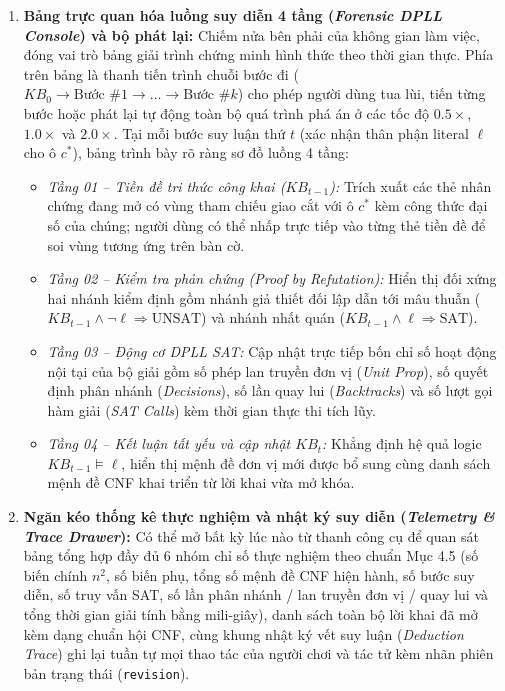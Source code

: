 \begin{enumerate}
    \item \textbf{Bảng trực quan hóa luồng suy diễn 4 tầng (\emph{Forensic DPLL Console}) và bộ phát lại:} Chiếm nửa bên phải của không gian làm việc, đóng vai trò bảng giải trình chứng minh hình thức theo thời gian thực. Phía trên bảng là thanh tiến trình chuỗi bước đi ($KB_0 \to \text{Bước \#1} \to \dots \to \text{Bước \#}k$) cho phép người dùng tua lùi, tiến từng bước hoặc phát lại tự động toàn bộ quá trình phá án ở các tốc độ $0.5\times$, $1.0\times$ và $2.0\times$. Tại mỗi bước suy luận thứ $t$ (xác nhận thân phận literal $\ell$ cho ô $c^*$), bảng trình bày rõ ràng sơ đồ luồng 4 tầng:
    \begin{itemize}
        \item \emph{Tầng 01 -- Tiền đề tri thức công khai ($KB_{t-1}$):} Trích xuất các thẻ nhân chứng đang mở có vùng tham chiếu giao cắt với ô $c^*$ kèm công thức đại số của chúng; người dùng có thể nhấp trực tiếp vào từng thẻ tiền đề để soi vùng tương ứng trên bàn cờ.
        \item \emph{Tầng 02 -- Kiểm tra phản chứng (\emph{Proof by Refutation}):} Hiển thị đối xứng hai nhánh kiểm định gồm nhánh giả thiết đối lập dẫn tới mâu thuẫn ($KB_{t-1} \land \neg\ell \Longrightarrow \text{UNSAT}$) và nhánh nhất quán ($KB_{t-1} \land \ell \Longrightarrow \text{SAT}$).
        \item \emph{Tầng 03 -- Động cơ DPLL SAT:} Cập nhật trực tiếp bốn chỉ số hoạt động nội tại của bộ giải gồm số phép lan truyền đơn vị (\emph{Unit Prop}), số quyết định phân nhánh (\emph{Decisions}), số lần quay lui (\emph{Backtracks}) và số lượt gọi hàm giải (\emph{SAT Calls}) kèm thời gian thực thi tích lũy.
        \item \emph{Tầng 04 -- Kết luận tất yếu và cập nhật $KB_t$:} Khẳng định hệ quả logic $KB_{t-1} \models \ell$, hiển thị mệnh đề đơn vị mới được bổ sung cùng danh sách mệnh đề CNF khai triển từ lời khai vừa mở khóa.
    \end{itemize}

    \item \textbf{Ngăn kéo thống kê thực nghiệm và nhật ký suy diễn (\emph{Telemetry \& Trace Drawer}):} Có thể mở bất kỳ lúc nào từ thanh công cụ để quan sát bảng tổng hợp đầy đủ 6 nhóm chỉ số thực nghiệm theo chuẩn Mục 4.5 (số biến chính $n^2$, số biến phụ, tổng số mệnh đề CNF hiện hành, số bước suy diễn, số truy vấn SAT, số lần phân nhánh / lan truyền đơn vị / quay lui và tổng thời gian giải tính bằng mili-giây), danh sách toàn bộ lời khai đã mở kèm dạng chuẩn hội CNF, cùng khung nhật ký vết suy luận (\emph{Deduction Trace}) ghi lại tuần tự mọi thao tác của người chơi và tác tử kèm nhãn phiên bản trạng thái (\texttt{revision}).
\end{enumerate}

